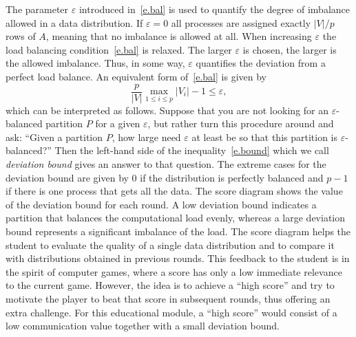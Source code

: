 \documentclass[12pt, twoside,a4paper,toc=bibliography]{scrbook}
\newcommand{\mat}[1]{\ensuremath{#1}}
\begin{document}
The parameter $\varepsilon$ introduced in~\eqref{e.bal} is used to quantify the degree of
imbalance allowed in a data distribution. If $\varepsilon = 0$ all processes are assigned
exactly $|V|/p$ rows of \mat{A}, meaning that no imbalance is allowed at all. When
increasing $\varepsilon$ the load balancing condition~\eqref{e.bal} is relaxed. The
larger $\varepsilon$ is chosen, the larger is the allowed imbalance. Thus, in some way,
$\varepsilon$ quantifies the deviation from a perfect load balance. An equivalent form
of~\eqref{e.bal} is given by
\begin{equation}\label{e.bound}
\frac{p}{|V|} \max_{1 \leq i \leq p} |V_i| - 1 \leq \varepsilon ,
\end{equation}
which can be interpreted as follows. Suppose that you are not looking for an
$\varepsilon$-balanced partition $P$ for a given $\varepsilon$, but rather turn this
procedure around and ask: ``Given a partition $P$, how large need $\varepsilon$ at least
be so that this partition is $\varepsilon$-balanced?'' Then the left-hand side of the
inequality~\eqref{e.bound} which we call \emph{deviation bound} gives an answer to that
question. The extreme cases for the deviation bound are given by 0 if the distribution is
perfectly balanced and $p-1$ if there is one process that gets all the data. The score
diagram shows the value of the deviation bound for each round. A low deviation bound
indicates a partition that balances the computational load evenly, whereas a large
deviation bound represents a significant imbalance of the load. The score diagram helps the
student to evaluate the quality of a single data distribution and to compare it with
distributions obtained in previous rounds. This feedback to the student is in
the spirit of computer games, where a score has only a low immediate relevance to the
current game. However, the idea is to achieve a ``high score'' and try to motivate the
player to beat that score in subsequent rounds, thus offering an extra challenge. For
this educational module, a ``high score'' would consist of a low communication value
together with a small deviation bound.

\end{document}
